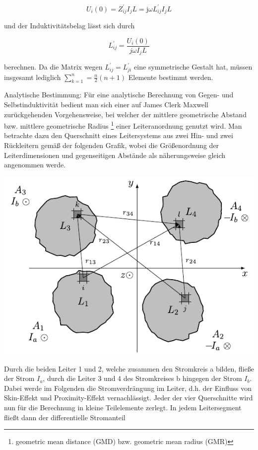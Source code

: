 \begin{equation}
	U_{i}(0)=Z_{i j}^{\prime} I_{j} L=\mathrm{j} \omega L_{i j}^{\prime} I_{j} L 
\end{equation}


und der Induktivitätsbelag lässt sich durch


\begin{equation}
	L_{i j}^{\prime}=\frac{U_{i}(0)}{j \omega I_{j} L} 
\end{equation}


berechnen. Da die Matrix wegen $L_{i j}^{\prime}=L_{j i}^{\prime}$ eine symmetrische Gestalt hat, müssen insgesamt lediglich $\sum_{k=1}^{n}=\frac{n}{2}(n+1)$ Elemente bestimmt werden.

Analytische Bestimmung: Für eine analytische Berechnung von Gegen- und Selbstinduktivität bedient man sich einer auf James Clerk Maxwell zurückgehenden Vorgehensweise, bei welcher der mittlere geometrische Abstand bzw. mittlere geometrische Radius \footnote{geometric mean distance (GMD) bzw. geometric mean radius (GMR)} einer Leiteranordnung genutzt wird. Man betrachte dazu den Querschnitt eines Leitersystems aus zwei Hin- und zwei Rückleitern gemäß der folgenden Grafik, wobei die Größenordnung der Leiterdimensionen und gegenseitigen Abstände als näherungsweise gleich angenommen werde.

\begin{center}
	\includegraphics{res/LT9}
\end{center}


Durch die beiden Leiter 1 und 2, welche zusammen den Stromkreis a bilden, fließe der Strom $I_{a}$, durch die Leiter 3 und 4 des Stromkreises b hingegen der Strom $I_{b}$. Dabei werde im Folgenden die Stromverdrängung im Leiter, d.h. der Einfluss von Skin-Effekt und Proximity-Effekt vernachlässigt. Jeder der vier Querschnitte wird nun für die Berechnung in kleine Teilelemente zerlegt. In jedem Leitersegment fließt dann der differentielle Stromanteil


